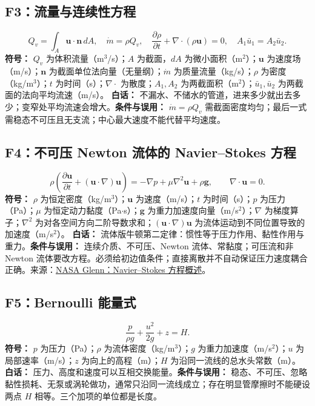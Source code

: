 \documentclass[UTF8,zihao=-4,openany,oneside,fontset=windows]{ctexbook}
\begin{document}
\subsection{F3：流量与连续性方程}
\begin{equation}
Q_v=\int_A\mathbf u\cdot\mathbf n\,dA,\quad \dot m=\rho Q_v,\quad \frac{\partial\rho}{\partial t}+\nabla\cdot(\rho\mathbf u)=0,\quad A_1\bar u_1=A_2\bar u_2.
\end{equation}
\textbf{符号：} $Q_v$ 为体积流量（m$^3$/s）；$A$ 为截面，$dA$ 为微小面积（m$^2$）；$\mathbf u$ 为速度场（m/s）；$\mathbf n$ 为截面单位法向量（无量纲）；$\dot m$ 为质量流量（kg/s）；$\rho$ 为密度（kg/m$^3$）；$t$ 为时间（s）；$\nabla\cdot$ 为散度；$A_1,A_2$ 为两截面积（m$^2$）；$\bar u_1,\bar u_2$ 为两截面的法向平均流速（m/s）。
\textbf{白话：} 不漏水、不储水的管道，进来多少就出去多少；变窄处平均流速会增大。\textbf{条件与误用：} $\dot m=\rho Q_v$ 需截面密度均匀；最后一式需稳态不可压且无支流；中心最大速度不能代替平均速度。

\subsection{F4：不可压 Newton 流体的 Navier--Stokes 方程}
\begin{equation}
\rho\left(\frac{\partial\mathbf u}{\partial t}+(\mathbf u\cdot\nabla)\mathbf u\right)=-\nabla p+\mu\nabla^2\mathbf u+\rho\mathbf g,\qquad \nabla\cdot\mathbf u=0.
\end{equation}
\textbf{符号：} $\rho$ 为恒定密度（kg/m$^3$）；$\mathbf u$ 为速度（m/s）；$t$ 为时间（s）；$p$ 为压力（Pa）；$\mu$ 为恒定动力黏度（Pa$\cdot$s）；$\mathbf g$ 为重力加速度向量（m/s$^2$）；$\nabla$ 为梯度算子；$\nabla^2$ 为对各空间方向二阶导数求和；$(\mathbf u\cdot\nabla)\mathbf u$ 为流体运动到不同位置导致的加速度（m/s$^2$）。
\textbf{白话：} 流体版牛顿第二定律：惯性等于压力作用、黏性作用与重力。\textbf{条件与误用：} 连续介质、不可压、Newton 流体、常黏度；可压流和非 Newton 流体要改方程。必须给初边值条件；直接离散并不自动保证压力速度耦合正确。来源：\href{https://www.grc.nasa.gov/www/k-12/airplane/nseqs.html}{NASA Glenn：Navier--Stokes 方程概述}。

\subsection{F5：Bernoulli 能量式}
\begin{equation}
\frac p{\rho g}+\frac{u^2}{2g}+z=H.
\end{equation}
\textbf{符号：} $p$ 为压力（Pa）；$\rho$ 为流体密度（kg/m$^3$）；$g$ 为重力加速度（m/s$^2$）；$u$ 为局部速率（m/s）；$z$ 为向上的高程（m）；$H$ 为沿同一流线的总水头常数（m）。
\textbf{白话：} 压力、高度和速度可以互相交换能量。\textbf{条件与误用：} 稳态、不可压、忽略黏性损耗、无泵或涡轮做功，通常只沿同一流线成立；存在明显管摩擦时不能硬设两点 $H$ 相等。三个加项的单位都是长度。
\end{document}
